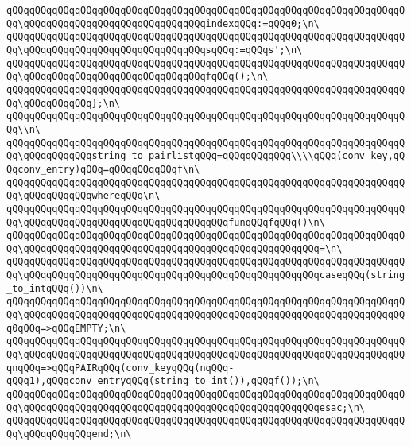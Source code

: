 \verb|qQQqqQQqqQQqqQQqqQQqqQQqqQQqqQQqqQQqqQQqqQQqqQQqqQQqqQQqqQQqqQQqqQQqqQQq\qQQqqQQqqQQqqQQqqQQqqQQqqQQqqQQqindexqQQq:=qQQq0;\n\|\newline
\verb|qQQqqQQqqQQqqQQqqQQqqQQqqQQqqQQqqQQqqQQqqQQqqQQqqQQqqQQqqQQqqQQqqQQqqQQq\qQQqqQQqqQQqqQQqqQQqqQQqqQQqqQQqsqQQq:=qQQqs';\n\|\newline
\verb|qQQqqQQqqQQqqQQqqQQqqQQqqQQqqQQqqQQqqQQqqQQqqQQqqQQqqQQqqQQqqQQqqQQqqQQq\qQQqqQQqqQQqqQQqqQQqqQQqqQQqqQQqfqQQq();\n\|\newline
\verb|qQQqqQQqqQQqqQQqqQQqqQQqqQQqqQQqqQQqqQQqqQQqqQQqqQQqqQQqqQQqqQQqqQQqqQQq\qQQqqQQqqQQq};\n\|\newline
\verb|qQQqqQQqqQQqqQQqqQQqqQQqqQQqqQQqqQQqqQQqqQQqqQQqqQQqqQQqqQQqqQQqqQQqqQQq\\n\|\newline
\verb|qQQqqQQqqQQqqQQqqQQqqQQqqQQqqQQqqQQqqQQqqQQqqQQqqQQqqQQqqQQqqQQqqQQqqQQq\qQQqqQQqqQQqstring_to_pairlistqQQq=qQQqqQQqqQQq\\\\qQQq(conv_key,qQQqconv_entry)qQQq=qQQqqQQqqQQqf\n\|\newline
\verb|qQQqqQQqqQQqqQQqqQQqqQQqqQQqqQQqqQQqqQQqqQQqqQQqqQQqqQQqqQQqqQQqqQQqqQQq\qQQqqQQqqQQqwhereqQQq\n\|\newline
\verb|qQQqqQQqqQQqqQQqqQQqqQQqqQQqqQQqqQQqqQQqqQQqqQQqqQQqqQQqqQQqqQQqqQQqqQQq\qQQqqQQqqQQqqQQqqQQqqQQqqQQqqQQqqQQqfunqQQqfqQQq()\n\|\newline
\verb|qQQqqQQqqQQqqQQqqQQqqQQqqQQqqQQqqQQqqQQqqQQqqQQqqQQqqQQqqQQqqQQqqQQqqQQq\qQQqqQQqqQQqqQQqqQQqqQQqqQQqqQQqqQQqqQQqqQQqqQQqqQQq=\n\|\newline
\verb|qQQqqQQqqQQqqQQqqQQqqQQqqQQqqQQqqQQqqQQqqQQqqQQqqQQqqQQqqQQqqQQqqQQqqQQq\qQQqqQQqqQQqqQQqqQQqqQQqqQQqqQQqqQQqqQQqqQQqqQQqqQQqcaseqQQq(string_to_intqQQq())\n\|\newline
\verb|qQQqqQQqqQQqqQQqqQQqqQQqqQQqqQQqqQQqqQQqqQQqqQQqqQQqqQQqqQQqqQQqqQQqqQQq\qQQqqQQqqQQqqQQqqQQqqQQqqQQqqQQqqQQqqQQqqQQqqQQqqQQqqQQqqQQqqQQqqQQq0qQQq=>qQQqEMPTY;\n\|\newline
\verb|qQQqqQQqqQQqqQQqqQQqqQQqqQQqqQQqqQQqqQQqqQQqqQQqqQQqqQQqqQQqqQQqqQQqqQQq\qQQqqQQqqQQqqQQqqQQqqQQqqQQqqQQqqQQqqQQqqQQqqQQqqQQqqQQqqQQqqQQqqQQqnqQQq=>qQQqPAIRqQQq(conv_keyqQQq(nqQQq-qQQq1),qQQqconv_entryqQQq(string_to_int()),qQQqf());\n\|\newline
\verb|qQQqqQQqqQQqqQQqqQQqqQQqqQQqqQQqqQQqqQQqqQQqqQQqqQQqqQQqqQQqqQQqqQQqqQQq\qQQqqQQqqQQqqQQqqQQqqQQqqQQqqQQqqQQqqQQqqQQqqQQqqQQqesac;\n\|\newline
\verb|qQQqqQQqqQQqqQQqqQQqqQQqqQQqqQQqqQQqqQQqqQQqqQQqqQQqqQQqqQQqqQQqqQQqqQQq\qQQqqQQqqQQqend;\n\|\newline
